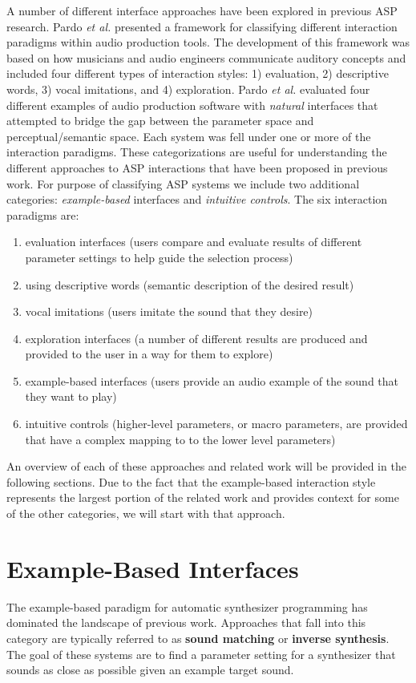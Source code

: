 A number of different interface approaches have been explored in previous ASP research. Pardo \textit{et al.} \cite{pardo2019learning} presented a framework for classifying different interaction paradigms within audio production tools. The development of this framework was based on how musicians and audio engineers communicate auditory concepts and included four different types of interaction styles: 1) evaluation, 2) descriptive words, 3) vocal imitations, and 4) exploration. Pardo \textit{et al.} evaluated four different examples of audio production software with \textit{natural} interfaces that attempted to bridge the gap between the parameter space and perceptual/semantic space. Each system was fell under one or more of the interaction paradigms. These categorizations are useful for understanding the different approaches to ASP interactions that have been proposed in previous work. For purpose of classifying ASP systems we include two additional categories: \textit{example-based} interfaces and \textit{intuitive controls}. The six interaction paradigms are:

\begin{enumerate}
    \item evaluation interfaces (users compare and evaluate results of different parameter settings to help guide the selection process)
    \item using descriptive words (semantic description of the desired result)
    \item vocal imitations (users imitate the sound that they desire)
    \item exploration interfaces (a number of different results are produced and provided to the user in a way for them to explore)
    \item example-based interfaces (users provide an audio example of the sound that they want to play)
    \item intuitive controls (higher-level parameters, or macro parameters, are provided that have a complex mapping to to the lower level parameters)
\end{enumerate}

An overview of each of these approaches and related work will be provided in the following sections. Due to the fact that the example-based interaction style represents the largest portion of the related work and provides context for some of the other categories, we will start with that approach.

\section{Example-Based Interfaces}
The example-based paradigm for automatic synthesizer programming has dominated the landscape of previous work. Approaches that fall into this category are typically referred to as \textbf{sound matching} or \textbf{inverse synthesis}. The goal of these systems are to find a parameter setting for a synthesizer that sounds as close as possible given an example target sound. 

